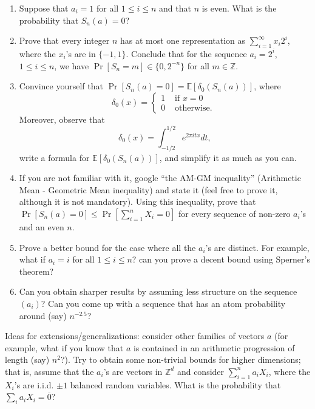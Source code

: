 \documentclass[11pt,letterpaper]{article}
\begin{document}
\begin{enumerate}
  \item Suppose that $a_i=1$ for all $1\leq i\leq n$ and that $n$ is even. What is the probability that $S_n(a)=0$? 
  \item Prove that every integer $n$ has at most one representation as $\sum_{i=1}^{\infty}x_i2^i$, where the $x_i$'s are in $\{-1,1\}$. Conclude that for the sequence $a_i=2^i$, $1\leq i\leq n$, we have
      $\Pr[S_n=m]\in \{0,2^{-n}\}$ for all $m\in \mathbb{Z}$.
  \item Convince yourself that $\Pr[S_n(a)=0]=\mathbb{E}[\delta_0(S_n(a))]$, where $$\delta_0(x)= \begin{cases} 1 & \text{ if }x=0 \\
  0 & \text{ otherwise. }\end{cases}$$
  Moreover, observe that
  $$\delta_0(x)=\int_{-1/2}^{1/2}e^{2\pi itx}dt,$$
  write a formula for $\mathbb{E}[\delta_0(S_n(a))]$, and simplify it as much as you can.
  \item If you are not familiar with it, google  ``the AM-GM  inequality'' (Arithmetic Mean - Geometric Mean inequality) and state it (feel free to prove it, although it is not mandatory). Using this inequality, prove that $\Pr[S_n(a)=0]\leq \Pr[\sum_{i=1}^nX_i=0]$ for every sequence of non-zero $a_i$'s and an even $n$.
  \item Prove a better bound for the case where all the $a_i$'s are distinct. For example, what if $a_i=i$ for all $1\leq i\leq n$? can you prove a decent bound using Sperner's theorem?
  \item Can you obtain sharper results by assuming less structure on the sequence $(a_i)$? Can you come up with a sequence that has an atom probability around (say) $n^{-2.5}$? 
\end{enumerate}

Ideas for extensions/generalizations: consider other families of vectors $a$ (for example, what if you know that $a$ is contained in an arithmetic progression of length (say) $n^2$?). Try to obtain some non-trivial bounds for higher dimensions; that is, assume that the $a_i$'s are vectors in $\mathbb{Z}^d$ and consider $\sum_{i=1}^na_iX_i$, where the $X_i$'s are i.i.d. $\pm1$ balanced random variables. What is the probability that $\sum_i a_iX_i=\overline{0}$?
\end{document}
